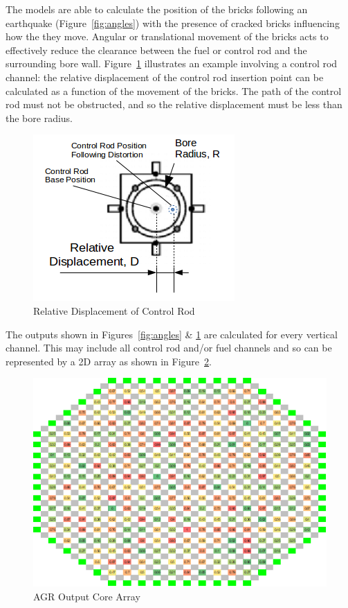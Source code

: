 
\noindent
The models are able to calculate the position of the bricks following an earthquake (Figure~\ref{fig:angles}) with the presence of cracked bricks influencing how the they move. Angular or translational movement of the bricks acts to effectively reduce the clearance between the fuel or control rod and the surrounding bore wall. Figure~\ref{fig:bore_clearance} illustrates an example involving a control rod channel: the relative displacement of the control rod insertion point can be calculated as a function of the movement of the bricks. The path of the control rod must not be obstructed, and so the relative displacement must be less than the bore radius. \\

\begin{figure}[ht!]
	\centering
	\includegraphics[scale=0.5]{Figures/bore_displacement}
	\caption{Relative Displacement of Control Rod}
	\label{fig:bore_clearance}
\end{figure}

\noindent
The outputs shown in Figures~\ref{fig:angles} \& \ref{fig:bore_clearance} are calculated for every vertical channel. This may include all control rod and/or fuel channels and so can be represented by a 2D array as shown in Figure~\ref{fig:output_array}.\\

\begin{figure}[ht!]
	\centering
	\includegraphics[scale=0.4]{Figures/agr_output.png}
	\caption{AGR Output Core Array}
	\label{fig:output_array}
\end{figure}

